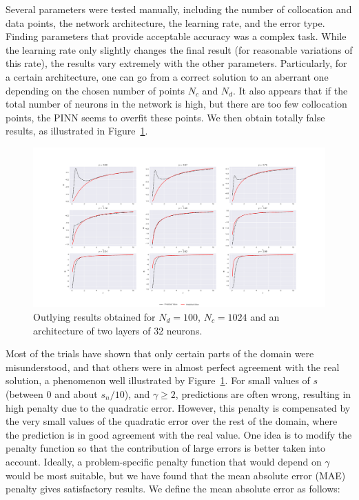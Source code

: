 \par Several parameters were tested manually, including the number of collocation and data points, the network architecture, the learning rate, and the error type. Finding parameters that provide acceptable accuracy was a complex task. While the learning rate only slightly changes the final result (for reasonable variations of this rate), the results vary extremely with the other parameters. Particularly, for a certain architecture, one can go from a correct solution to an aberrant one depending on the chosen number of points $N_c$ and $N_d$. It also appears that if the total number of neurons in the network is high, but there are too few collocation points, the PINN seems to overfit these points. We then obtain totally false results, as illustrated in Figure~\ref{fig:aberration-dehnen}.

\begin{figure}
    \centering
    \includegraphics[width=\textwidth]{imgs/aberration-dehnen.png}
    \caption{Outlying results obtained for $N_d=100$, $N_c=1024$ and an architecture of two layers of 32 neurons.}
    \label{fig:aberration-dehnen}
\end{figure}

Most of the trials have shown that only certain parts of the domain were misunderstood, and that others were in almost perfect agreement with the real solution, a phenomenon well illustrated by Figure~\ref{fig:aberration-dehnen}. For small values of $s$ (between 0 and about $s_n/10$), and $\gamma \geq 2$, predictions are often wrong, resulting in high penalty due to the quadratic error. However, this penalty is compensated by the very small values of the quadratic error over the rest of the domain, where the prediction is in good agreement with the real value. One idea is to modify the penalty function so that the contribution of large errors is better taken into account. Ideally, a problem-specific penalty function that would depend on $\gamma$ would be most suitable, but we have found that the mean absolute error (MAE) penalty gives satisfactory results. We define the mean absolute error as follows:

